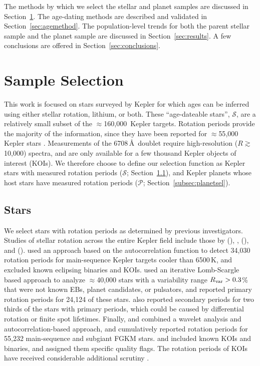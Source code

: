 \documentclass[12pt,twocolumn,tighten]{aastex63}
\newcommand{\nkeplerstars}{$\approx$160{,}000}
\begin{document}
The methods by which we select the stellar and planet samples are 
discussed in Section~\ref{sec:selection}.
The age-dating methods are described and validated in
Section~\ref{sec:agemethod}.
The population-level trends for both the parent stellar sample and
the planet sample are discussed in Section~\ref{sec:results}.
A few conclusions are offered in Section~\ref{sec:conclusions}.


\section{Sample Selection}
\label{sec:selection}

This work is focused on stars surveyed by Kepler for which ages can be
inferred using either stellar rotation, lithium, or both.  These
``age-dateable stars'', $\mathcal{S}$, are a relatively small subset
of the \nkeplerstars\ Kepler targets.  Rotation periods provide
the majority of the information, since they have been reported for
$\approx$55{,}000 Kepler stars
\citep[e.g.][]{McQuillan_2014,Santos_2021}.  Measurements of the
 6708\,\AA\ doublet require high-resolution
($R\gtrsim$10{,}000) spectra, and are only available for a few
thousand Kepler objects of interest (KOIs).  We therefore choose to
define our selection function as Kepler stars with measured
rotation periods ($\mathcal{S}$; Section~\ref{subsec:starsel}), and
Kepler planets whose host stars have measured rotation periods
($\mathcal{P}$; Section~\ref{subsec:planetsel}).


\subsection{Stars}
\label{subsec:starsel}

We select stars with rotation periods as determined by previous
investigators.  Studies of stellar rotation across the entire Kepler field
include those by \citet{McQuillan_2014} (),
\citet{Reinhold_2015},
\citet{Santos_2019} (), and
\citet{Santos_2021} ().
 used an approach
based on the autocorrelation function to detect 34{,}030 rotation
periods for main-sequence Kepler targets cooler than 6500\,K, and excluded
known eclipsing binaries and KOIs.  
\citet{Reinhold_2015} used an iterative Lomb-Scargle based approach to
analyze $\approx$40{,}000 stars with a variability range $R_{\rm
	var}>0.3$\% that were not known EBs, planet candidates, or pulsators,
and reported primary rotation periods for 24{,}124 of these stars.
\citet{Reinhold_2015} also reported secondary periods for two thirds
of the stars with primary periods, which could be caused by
differential rotation or finite spot lifetimes.  
Finally,
 and
 combined a wavelet analysis and
autocorrelation-based approach, and cumulatively reported rotation
periods for 55{,}232 main-sequence and subgiant FGKM stars.
 and  included known
KOIs and binaries, and assigned them specific quality flags.  
The rotation periods of KOIs have received considerable additional
scrutiny
\citep[e.g.][]{Walkowicz_2013,Mazeh_2015,Angus_2018,David_2021}.
\end{document}
